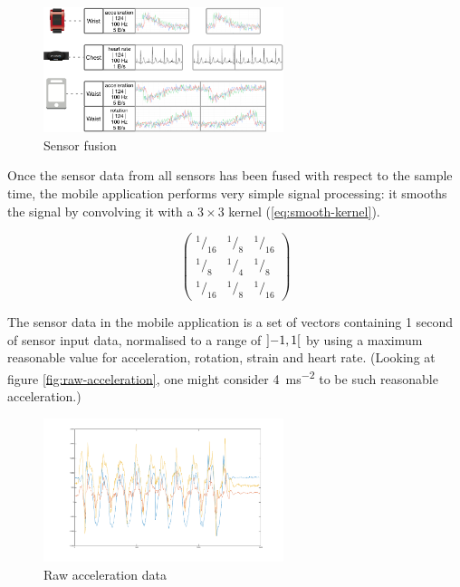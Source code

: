 \documentclass[a4paper, 10 pt, conference]{IEEEtran}
\begin{document}
\begin{figure}[hb]
	\begin{center}
		\caption{Sensor fusion}
		\label{fig:sensor-fusion}
		\includegraphics[width=7cm,keepaspectratio]{ri-sensor-fusion.png}
	\end{center}
\end{figure}

Once the sensor data from all sensors has been fused with respect to the sample time, the mobile application performs very simple signal processing: it smooths the signal by convolving it with a $3 \times 3$ kernel (\autoref{eq:smooth-kernel}).

\begin{equation} \label{eq:smooth-kernel}
	\begin{pmatrix}
	  ^1/_{16} & ^1/_8 & ^1/_{16} \\
	  ^1/_8    & ^1/_4 & ^1/_8    \\
	  ^1/_{16} & ^1/_8 & ^1/_{16}
	\end{pmatrix}
\end{equation}


The sensor data in the mobile application is a set of vectors containing 1 second of sensor input data, normalised to a range of $\interval[open]{-1}{1}$ by using a maximum reasonable value for acceleration, rotation, strain and heart rate. (Looking at figure \autoref{fig:raw-acceleration}, one might consider \SI{4}{ms^{-2}} to be such reasonable acceleration.) 

\begin{figure}[hp]
	\begin{center}
		\caption{Raw acceleration data}
		\label{fig:raw-acceleration}
		\includegraphics[width=7cm,keepaspectratio]{ri-raw-acceleration.png}
	\end{center}
\end{figure}
\end{document}
